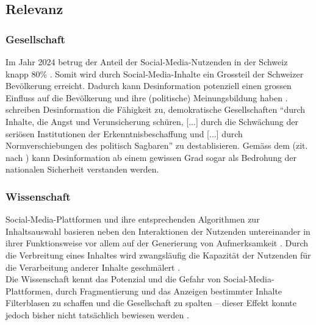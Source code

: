 \documentclass[12pt,a4paper]{article}        %
\begin{document}
\subsection{Relevanz}

\subsubsection{Gesellschaft}
Im Jahr 2024 betrug der Anteil der Social-Media-Nutzenden in der Schweiz knapp 80\% \parencite[22]{we_are_social_anteil_2024}. Somit wird durch Social-Media-Inhalte ein Grossteil der Schweizer Bevölkerung erreicht. Dadurch kann Desinformation potenziell einen grossen Einfluss auf die Bevölkerung und ihre (politische) Meinungsbildung haben \parencites[18]{grujic_warnhinweise_2024}[258]{hohlfeld_schlechte_2020}[1]{khan_fake_2021}. \\
\textcite[258]{hohlfeld_schlechte_2020} schreiben Desinformation die Fähigkeit zu, demokratische Gesellschaften “durch Inhalte, die Angst und Verunsicherung schüren, [...] durch die Schwächung der seriösen Institutionen der Erkenntnisbeschaffung und [...] durch Normverschiebungen des politisch Sagbaren” zu destablisieren. Gemäss dem \textcite{bundesministerium_des_innern_und_fur_heimat_desinformation_2022} (zit. nach \textcite[15]{teetz_social-media-post_2023}) kann Desinformation ab einem gewissen Grad sogar als Bedrohung der nationalen Sicherheit verstanden werden.

\subsubsection{Wissenschaft}
Social-Media-Plattformen und ihre entsprechenden Algorithmen zur Inhaltsauswahl basieren neben den Interaktionen der Nutzenden untereinander in ihrer Funktionsweise vor allem auf der Generierung von Aufmerksamkeit \parencites[vgl.][220]{schmidt_meinungsbildung_2022}[493]{behnke_manipulation_2018}. Durch die Verbreitung eines Inhaltes wird zwangsläufig die Kapazität der Nutzenden für die Verarbeitung anderer Inhalte geschmälert \parencite[248]{hohlfeld_schlechte_2020}. \\
Die Wissenschaft kennt das Potenzial und die Gefahr von Social-Media-Plattformen, durch Fragmentierung und das Anzeigen bestimmter Inhalte Filterblasen zu schaffen und die Gesellschaft zu spalten – dieser Effekt konnte jedoch bisher nicht tatsächlich bewiesen werden \parencite[220]{schmidt_meinungsbildung_2022}.\\
\end{document}

